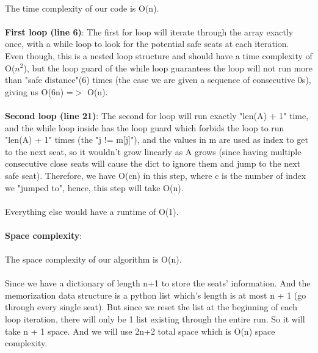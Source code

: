 \documentclass{assignment-373}
\begin{document}
\begin{enumerate}
\begin{enumerate}
  \\
  \phantom{=} \phantom{=} The time complexity of our code is O(n).\\
  \\
  \phantom{=} \phantom{=} \phantom{=} \phantom{=} {\bf First loop (line 6)}: The first for loop will iterate through the array exactly once, with a while loop to look for the potential safe seats at each iteration.\\
  \phantom{=} \phantom{=} \phantom{=} \phantom{=} Even though, this is a nested loop structure and should have a time complexity of O($n^2$), but the loop guard of the while loop guarantees the loop will not run more than "safe distance"(6) times (the case we are given a sequence of consecutive 0s), giving us O(6n) =$>$ O(n).\\
  \\
  \phantom{=} \phantom{=} \phantom{=} \phantom{=} {\bf Second loop (line 21)}: The second for loop will run exactly "len(A) + 1" time, and the while loop inside has the loop guard which forbids the loop to run "len(A) + 1" times (the "j != m[j]"), and the values in m are used as index to get to the next seat, so it wouldn't grow linearly as A grows (since having multiple consecutive close seats will cause the dict to ignore them and jump to the next safe seat). Therefore, we have O(cn) in this step, where c is the number of index we "jumped to", hence, this step will take O(n).\\
  \\
  \phantom{=} \phantom{=} \phantom{=} \phantom{=} Everything else would have a runtime of O(1).\\
\\
{\bf Space complexity}: \\
\\
\phantom{=} \phantom{=} The space complexity of our algorithm is O(n).\\
\\
\phantom{=} \phantom{=} Since we have a dictionary of length n+1 to store the seats' information. And the memorization data structure is a python list which's length is at most n + 1 (go through every single seat). But since we reset the list at the beginning of each loop iteration, there will only be 1 list existing through the entire run. So it will take n + 1 space. And we will use 2n+2 total space which is O(n) space complexity.
  \end{enumerate}
  
\end{enumerate}
\end{document}

